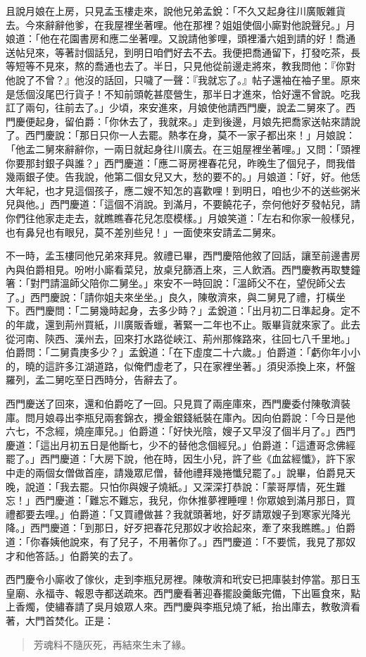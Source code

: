 且說月娘在上房，只見孟玉樓走來，說他兄弟孟銳：「不久又起身往川廣販雜貨去。今來辭辭他爹，在我屋裡坐著哩。他在那裡？姐姐使個小廝對他說聲兒。」月娘道：「他在花園書房和應二坐著哩。又說請他爹哩，頭裡潘六姐到請的好！喬通送帖兒來，等著討個話兒，到明日咱們好去不去。我便把喬通留下，打發吃茶，長等短等不見來，熬的喬通也去了。半日，只見他從前邊走將來，教我問他：『你對他說了不曾？』他沒的話回，只噦了一聲：『我就忘了。』帖子還袖在袖子里。原來是恁個沒尾巴行貨子！不知前頭乾甚麼營生，那半日才進來，恰好還不曾說。吃我訌了兩句，往前去了。」少頃，來安進來，月娘使他請西門慶，說孟二舅來了。西門慶便起身，留伯爵：「你休去了，我就來。」走到後邊，月娘先把喬家送帖來請說了。西門慶說：「那日只你一人去罷。熱孝在身，莫不一家子都出來！」月娘說：「他孟二舅來辭辭你，一兩日就起身往川廣去。在三姐屋裡坐著哩。」又問：「頭裡你要那封銀子與誰？」西門慶道：「應二哥房裡春花兒，昨晚生了個兒子，問我借幾兩銀子使。告我說，他第二個女兒又大，愁的要不的。」月娘道：「好，好。他恁大年紀，也才見這個孩子，應二嫂不知怎的喜歡哩！到明日，咱也少不的送些粥米兒與他。」西門慶道：「這個不消說。到滿月，不要饒花子，奈何他好歹發帖兒，請你們往他家走走去，就瞧瞧春花兒怎麼模樣。」月娘笑道：「左右和你家一般樣兒，也有鼻兒也有眼兒，莫不差別些兒！」一面使來安請孟二舅來。

不一時，孟玉樓同他兄弟來拜見。敘禮已畢，西門慶陪他敘了回話，讓至前邊書房內與伯爵相見。吩咐小廝看菜兒，放桌兒篩酒上來，三人飲酒。西門慶教再取雙鐘箸：「對門請溫師父陪你二舅坐。」來安不一時回說：「溫師父不在，望倪師父去了。」西門慶說：「請你姐夫來坐坐。」良久，陳敬濟來，與二舅見了禮，打橫坐下。西門慶問：「二舅幾時起身，去多少時？」孟銳道：「出月初二日準起身。定不的年歲，還到荊州買紙，川廣販香蠟，著緊一二年也不止。販畢貨就來家了。此去從河南、陝西、漢州去，回來打水路從峽江、荊州那條路來，往回七八千里地。」伯爵問：「二舅貴庚多少？」孟銳道：「在下虛度二十六歲。」伯爵道：「虧你年小小的，曉的這許多江湖道路，似俺們虛老了，只在家裡坐著。」須臾添換上來，杯盤羅列，孟二舅吃至日西時分，告辭去了。

西門慶送了回來，還和伯爵吃了一回。只見買了兩座庫來，西門慶委付陳敬濟裝庫。問月娘尋出李瓶兒兩套錦衣，攪金銀錢紙裝在庫內。因向伯爵說：「今日是他六七，不念經，燒座庫兒。」伯爵道：「好快光陰，嫂子又早沒了個半月了。」西門慶道：「這出月初五日是他斷七，少不的替他念個經兒。」伯爵道：「這遭哥念佛經罷了。」西門慶道：「大房下說，他在時，因生小兒，許了些《血盆經懺》，許下家中走的兩個女僧做首座，請幾眾尼僧，替他禮拜幾捲懺兒罷了。」說畢，伯爵見天晚，說道：「我去罷。只怕你與嫂子燒紙。」又深深打恭說：「蒙哥厚情，死生難忘！」西門慶道：「難忘不難忘，我兒，你休推夢裡睡哩！你眾娘到滿月那日，買禮都要去哩。」伯爵道：「又買禮做甚？我就頭著地，好歹請眾嫂子到寒家光降光降。」西門慶道：「到那日，好歹把春花兒那奴才收拾起來，牽了來我瞧瞧。」伯爵道：「你春姨他說來，有了兒子，不用著你了。」西門慶道：「不要慌，我見了那奴才和他答話。」伯爵笑的去了。

西門慶令小廝收了傢伙，走到李瓶兒房裡。陳敬濟和玳安已把庫裝封停當。那日玉皇廟、永福寺、報恩寺都送疏來。西門慶看著迎春擺設羹飯完備，下出匾食來，點上香燭，使繡春請了吳月娘眾人來。西門慶與李瓶兒燒了紙，抬出庫去，教敬濟看著，大門首焚化。正是：
\begin{quote}
芳魂料不隨灰死，再結來生未了緣。
\end{quote}
